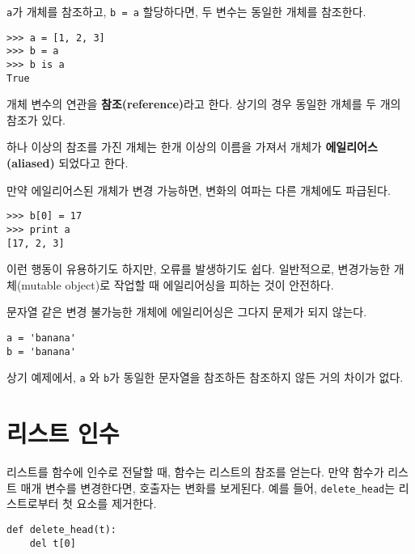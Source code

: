 
{\tt a}가 개체를 참조하고, {\tt b = a} 할당하다면, 두 변수는 동일한 개체를 참조한다.

\beforeverb
\begin{verbatim}
>>> a = [1, 2, 3]
>>> b = a
>>> b is a
True
\end{verbatim}
\afterverb
%

개체 변수의 연관을 {\bf 참조(reference)}라고 한다. 상기의 경우 동일한 개체를 두 개의 참조가 있다.


하나 이상의 참조를 가진 개체는 한개 이상의 이름을 가져서 개체가 {\bf 에일리어스(aliased)} 되었다고 한다.


만약 에일리어스된 개체가 변경 가능하면, 변화의 여파는 다른 개체에도 파급된다.

\beforeverb
\begin{verbatim}
>>> b[0] = 17
>>> print a
[17, 2, 3]
\end{verbatim}
\afterverb
%

이런 행동이 유용하기도 하지만, 오류를 발생하기도 쉽다. 일반적으로, 변경가능한 개체(mutable object)로 작업할 때 에일리어싱을 피하는 것이 안전하다.


문자열 같은 변경 불가능한 개체에 에일리어싱은 그다지 문제가 되지 않는다. 

\beforeverb
\begin{verbatim}
a = 'banana'
b = 'banana'
\end{verbatim}
\afterverb
%
상기 예제에서, {\tt a} 와 {\tt b}가 동일한 문자열을 참조하든 참조하지 않든 거의 차이가 없다.

\section{리스트 인수}


리스트를 함수에 인수로 전달할 때, 함수는 리스트의 참조를 얻는다. 만약 함수가 리스트 매개 변수를 변경한다면, 호출자는 변화를 보게된다.
예를 들어, \verb"delete_head"는 리스트로부터 첫 요소를 제거한다.

\beforeverb
\begin{verbatim}
def delete_head(t):
    del t[0]
\end{verbatim}
\afterverb
%

